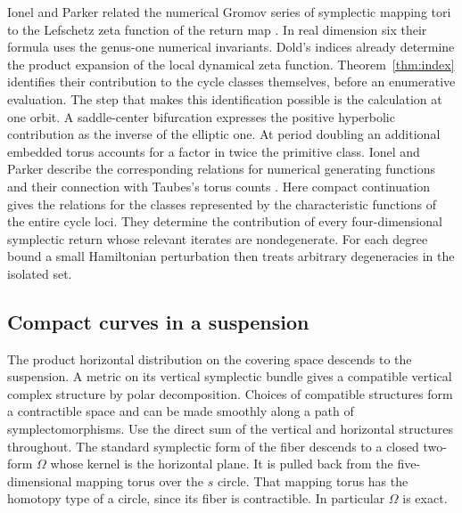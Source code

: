 Ionel and Parker related the numerical Gromov series of symplectic
mapping tori to the Lefschetz zeta function of the return map
\cite[Theorems~0.1 and~4.1]{IPmaps}. In real dimension six their formula
uses the genus-one numerical invariants. Dold's indices already determine
the product expansion of the local dynamical zeta function.
Theorem~\ref{thm:index} identifies their contribution to the
cycle classes themselves, before an enumerative evaluation. The step
that makes this identification possible is the calculation at one orbit.
A saddle-center bifurcation expresses the positive hyperbolic contribution
as the inverse of the elliptic one. At period doubling an additional
embedded torus accounts for a factor in twice the primitive class.
Ionel and Parker describe the corresponding relations for numerical
generating functions and their connection with Taubes's torus counts
\cite[Remark~3.4]{IPmaps}. Here compact continuation gives the relations
for the classes represented by the characteristic functions of the entire cycle loci. They determine
the contribution of every four-dimensional symplectic return whose
relevant iterates are nondegenerate. For each degree bound a small
Hamiltonian perturbation then treats arbitrary degeneracies in the isolated set.

\subsection{Compact curves in a suspension}\label{sec:suspension}

The product horizontal distribution on the covering space descends to the
suspension. A metric on its vertical symplectic bundle gives a compatible
vertical complex structure by polar decomposition. Choices of compatible
structures form a contractible space and can be made smoothly along a
path of symplectomorphisms. Use the direct sum of the vertical and
horizontal structures throughout. The standard symplectic form of the
fiber descends to a closed two-form $\Omega$ whose kernel is the horizontal
plane. It is pulled back from the five-dimensional mapping torus over the
$s$ circle. That mapping torus has the homotopy type of a circle, since
its fiber is contractible. In particular $\Omega$ is exact.

